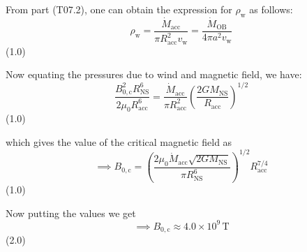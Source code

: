 \begin{description}
  From part (T07.2), one can obtain the expression for $\rho_{\mathrm{w}}$ as
  follows:
  \[
    \rho_{\mathrm{w}}
      = \frac{\dot{M}_{\mathrm{acc}}}{\pi R_{\mathrm{acc}}^2 v_{\mathrm{w}}}
      = \frac{\dot{M}_{\mathrm{OB}}}{4\pi a^2 v_{\mathrm{w}}}
  \]
  \hfill(1.0)

  Now equating the pressures due to wind and magnetic field, we have:
  \[
    \frac{B_{0,\mathrm{c}}^2 R_{\mathrm{NS}}^6}{2\mu_0 R_{\mathrm{acc}}^6}
      = \frac{\dot{M}_{\mathrm{acc}}}{\pi R_{\mathrm{acc}}^2}
        \left(\frac{2 G M_{\mathrm{NS}}}{R_{\mathrm{acc}}}\right)^{1/2}
  \]
  \hfill(1.0)

  which gives the value of the critical magnetic field as
  \[
    \implies B_{0,\mathrm{c}}
      = \left(\frac{2\mu_0 \dot{M}_{\mathrm{acc}}
          \sqrt{2 G M_{\mathrm{NS}}}}{\pi R_{\mathrm{NS}}^6}\right)^{1/2}
        R_{\mathrm{acc}}^{7/4}
  \]
  \hfill(1.0)

  Now putting the values we get
  \[
    \implies B_{0,\mathrm{c}} \approx 4.0 \times 10^{9}\,\mathrm{T}
  \]
  \hfill(2.0)
\end{description}

